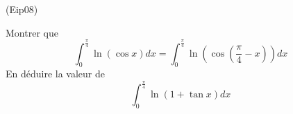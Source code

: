 \begin{tiny}(Eip08)\end{tiny}
Montrer que 
\begin{displaymath}
 \int_{0}^{\frac{\pi}{4}}\ln(\cos x)dx = \int_{0}^{\frac{\pi}{4}}\ln(\cos(\frac{\pi}{4}- x))dx 
\end{displaymath}
En déduire la valeur de 
\begin{displaymath}
 \int_{0}^{\frac{\pi}{4}}\ln(1+\tan x)dx 
\end{displaymath}
